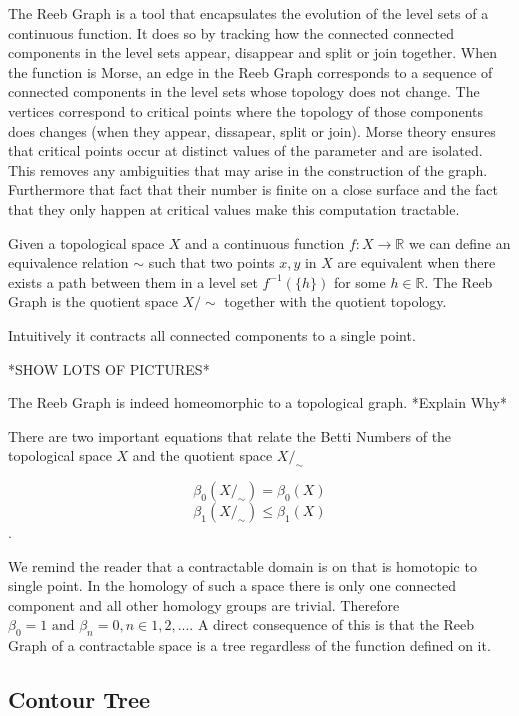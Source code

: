 The Reeb Graph is a tool that encapsulates the evolution of the level sets of a continuous function. It does so by tracking how the connected connected components in the level sets appear, disappear and split or join together. When the function is Morse, an edge in the Reeb Graph corresponds to a sequence of connected components in the level sets whose topology does not change. The vertices correspond to critical points where the topology of those components does changes (when they appear, dissapear, split or join). Morse theory ensures that critical points occur at distinct values of the parameter and are isolated. This removes any ambiguities that may arise in the construction of the graph. Furthermore that fact that their number is finite on a close surface and the fact that they only happen at critical values make this computation tractable.


\begin{defn}
Given a topological space $X$ and a continuous function $f: X \to \mathbb{R}$ we can define an equivalence relation $\sim$ such that two points $x, y$ in $X$ are equivalent when there exists a path between them in a level set $f^{-1}(\{h\})$ for some $h \in \mathbb{R}$. The Reeb Graph is the quotient space $X \big/ \sim$ together with the quotient topology.
\end{defn}

Intuitively it contracts all connected components to a single point.

*SHOW LOTS OF PICTURES*


The Reeb Graph is indeed homeomorphic to a topological graph. *Explain Why*

There are two important equations that \cite{comp-topo} relate the Betti Numbers of the topological space $X$ and the quotient space $X \big/ _\sim$

$$ \beta_0(X \big/ _\sim) = \beta_0(X) $$
$$ \beta_1(X \big/ _\sim) \le \beta_1(X) $$.

We remind the reader that a contractable domain is on that is homotopic to single point. In the homology of such a space there is only one connected component and all other homology groups are trivial. Therefore $\beta_0 = 1 \text{ and } \beta_n = 0, n \in {1, 2, ...}$. A direct consequence of this is that the Reeb Graph of a contractable space is a tree regardless of the function defined on it.

\subsection{Contour Tree}

